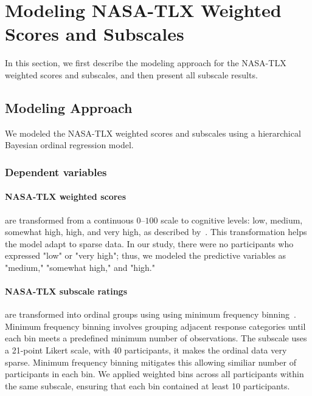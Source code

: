 \newpage
\section{Modeling NASA-TLX Weighted Scores and Subscales}
\label{apdx:model_tlx}
In this section, we first describe the modeling approach for the NASA-TLX weighted scores and subscales, and then present all subscale results.

\subsection{Modeling Approach}
We modeled the NASA-TLX weighted scores and subscales using a hierarchical Bayesian ordinal regression model. 

\subsubsection{Dependent variables}
\paragraph{NASA-TLX weighted scores} are transformed from a continuous $0$–$100$ scale to cognitive levels: low, medium, somewhat high, high, and very high, as described by~\textcite{hart1988development}. This transformation helps the model adapt to sparse data. In our study, there were no participants who expressed "low" or "very high"; thus, we modeled the predictive variables as "medium," "somewhat high," and "high."

\paragraph{NASA-TLX subscale ratings} are transformed into ordinal groups using using minimum frequency binning~\cite{frank2001simple}. Minimum frequency binning involves grouping adjacent response categories until each bin meets a predefined minimum number of observations. The subscale uses a 21-point Likert scale, with 40 participants, it makes the ordinal data very sparse. Minimum frequency binning mitigates this allowing similiar number of participants in each bin. We applied weighted bins across all participants within the same subscale, ensuring that each bin contained at least 10 participants.

